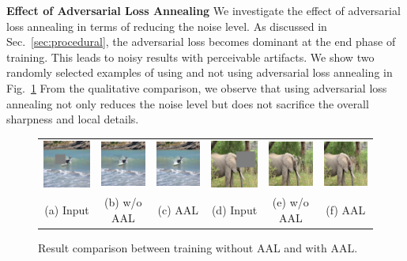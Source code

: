 \noindent\textbf{Effect of Adversarial Loss Annealing} We investigate the effect of adversarial loss annealing in terms of reducing the noise level. As discussed in Sec.~\ref{sec:procedural}, the adversarial loss becomes dominant at the end phase of training. This leads to noisy results with perceivable artifacts. We show two randomly selected examples of using and not using adversarial loss annealing in Fig.~\ref{fig:aal} From the qualitative comparison, we observe that using adversarial loss annealing not only reduces the noise level but does not sacrifice the overall sharpness and local details.

\begin{figure}[h!]
\centering
\small
\begin{tabular}{cccccc}
\includegraphics[width=.16\textwidth]{figures/AAL/000000063154_input_image.jpg}&
\includegraphics[width=.16\textwidth]{figures/AAL/000000063154_synthesized_image.jpg}&
\includegraphics[width=.16\textwidth]{figures/AAL/000000063154_synthesized_image-1.jpg}&
\includegraphics[width=.16\textwidth]{figures/AAL/000000475779_input_image.jpg}&
\includegraphics[width=.16\textwidth]{figures/AAL/000000475779_synthesized_image.jpg}&
\includegraphics[width=.16\textwidth]{figures/AAL/000000475779_synthesized_image-1.jpg}\\
(a) Input & (b) w/o AAL & (c) AAL & (d) Input & (e) w/o AAL & (f) AAL \\
\end{tabular}
\caption{Result comparison between training without AAL and with AAL.}
\label{fig:aal}
\vspace{-10pt}
\end{figure}  

